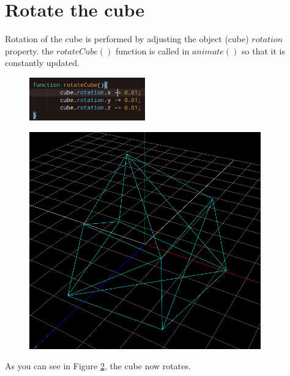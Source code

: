 \documentclass[12pt]{article}
\begin{document}
\section{Rotate the cube}
Rotation of the cube is performed by adjusting the object (cube) $rotation$ property. the $rotateCube()$ function is called in $animate()$ so that it is constantly updated.
\begin{figure}[H]  
    \centering
    \includegraphics[width=5cm]{3.png}
    \caption{}
    \label{fig:3}
\end{figure}
\begin{figure}[H]  
    \centering
    \includegraphics[width=10cm]{4.png}
    \caption{}
    \label{fig:4}
\end{figure}
As you can see in Figure \ref{fig:4}, the cube now rotates.
\end{document}
